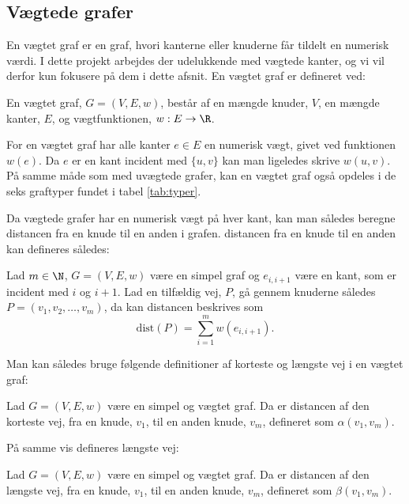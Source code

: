 \subsection{Vægtede grafer}
En vægtet graf er en graf, hvori kanterne eller knuderne får tildelt en numerisk værdi. I dette projekt arbejdes der udelukkende med vægtede kanter, og vi vil derfor kun fokusere på dem i dette afsnit.
En vægtet graf er defineret ved:
\begin{defn}
En vægtet graf, $G=(V,E,w)$, består af en mængde knuder, $V$, en mængde kanter, $E$, og vægtfunktionen, $w: E \rightarrow \R$.
\end{defn}

For en vægtet graf har alle kanter $e\in E$ en numerisk vægt, givet ved funktionen $w (e)$. Da $e$ er en kant incident med $\{u,v\}$ kan man ligeledes skrive $w (u,v)$. På samme måde som med uvægtede grafer, kan en vægtet graf også opdeles i de seks graftyper fundet i tabel \ref{tab:typer}.


Da vægtede grafer har en numerisk vægt på hver kant, kan man således beregne distancen fra en knude til en anden i grafen. distancen fra en knude til en anden kan defineres således:

\begin{defn}[Distance]
Lad $m\in \N $, $G=(V,E,w)$ være en simpel graf og  $e_{i,i+1}$ være en kant, som er incident med $i$ og $i+1$. Lad en tilfældig vej, $P$, gå gennem knuderne således $P=(v_1,v_2,\dotsc,v_m)$, da kan distancen beskrives som
	\begin{equation*}
	\mathrm{dist}(P)=\sum_{i=1}^{m}w(e_{i,i+1}).
	\end{equation*}  
\end{defn}

Man kan således bruge følgende definitioner af korteste og længste vej i en vægtet graf:


\begin{defn} \label{defn:min.vej}
Lad $G=(V,E,w)$ være en simpel og vægtet graf. Da er distancen af den korteste vej, fra en knude, $v_1$, til en anden knude, $v_m$, defineret som $\alpha(v_1,v_m)$.
\end{defn}

På samme vis defineres længste vej:

\begin{defn} 
Lad $G=(V,E,w)$ være en simpel og vægtet graf. Da er distancen af den længste vej, fra en knude, $v_1$, til en anden knude, $v_m$, defineret som $\beta(v_1,v_m)$.
\end{defn}

